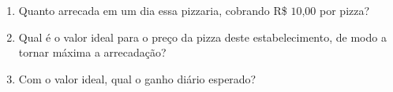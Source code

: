 \begin{enumerate}
\begin{enumerate}
\item {} 
Quanto arrecada em um dia essa pizzaria, cobrando R\$ \(10\text{,}00\) por pizza?

\item {} 
Qual é o valor ideal para o preço da pizza deste estabelecimento, de modo a tornar máxima a arrecadação?

\item {} 
Com o valor ideal, qual o ganho diário esperado?

\end{enumerate}
\end{enumerate}

\ifnum{}
\clearpage
\else
\notasfinais
\fi




\nocite{*}